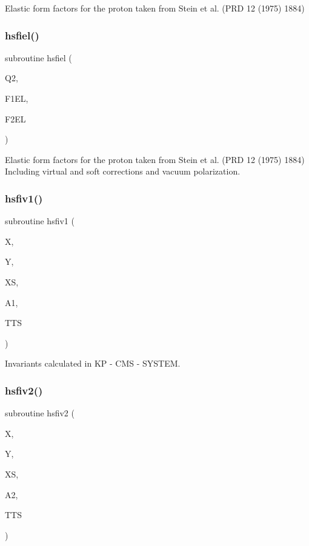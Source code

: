 Elastic form factors for the proton taken from Stein et al. (P\+RD 12 (1975) 1884) 

\mbox{\label{djangoh__h_8f_aa7cd38bce4aef6013280e31f71bdc178}} 
\subsubsection{\texorpdfstring{hsfiel()}{hsfiel()}}
{\footnotesize\ttfamily subroutine hsfiel (\begin{DoxyParamCaption}\item[{}]{Q2,  }\item[{}]{F1\+EL,  }\item[{}]{F2\+EL }\end{DoxyParamCaption})}



Elastic form factors for the proton taken from Stein et al. (P\+RD 12 (1975) 1884) Including virtual and soft corrections and vacuum polarization. 

\mbox{\label{djangoh__h_8f_aff94430da824540e2ef916d64fbabe04}} 
\subsubsection{\texorpdfstring{hsfiv1()}{hsfiv1()}}
{\footnotesize\ttfamily subroutine hsfiv1 (\begin{DoxyParamCaption}\item[{}]{X,  }\item[{}]{Y,  }\item[{}]{XS,  }\item[{}]{A1,  }\item[{}]{T\+TS }\end{DoxyParamCaption})}



Invariants calculated in KP -\/ C\+MS -\/ S\+Y\+S\+T\+EM. 

\mbox{\label{djangoh__h_8f_ab9ff484ceb4fac27e8d018d8c9e1e948}} 
\subsubsection{\texorpdfstring{hsfiv2()}{hsfiv2()}}
{\footnotesize\ttfamily subroutine hsfiv2 (\begin{DoxyParamCaption}\item[{}]{X,  }\item[{}]{Y,  }\item[{}]{XS,  }\item[{}]{A2,  }\item[{}]{T\+TS }\end{DoxyParamCaption})}



